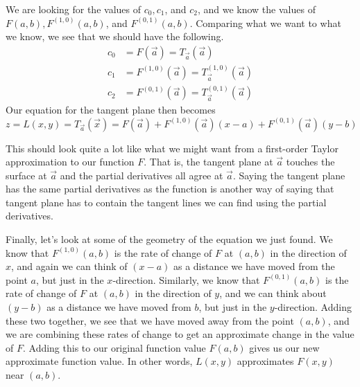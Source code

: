 \documentclass{ximera}
\begin{document}
We are looking for the values of $c_0, c_1$, and $c_2$, and we know the values of $F(a,b), F^{(1,0)}(a,b)$, and $F^{(0,1)}(a,b)$.  Comparing what we want to what we know, we see that we should have the following.
\begin{align*}
c_0 &= F(\vec{a})=T_{\vec{a}}(\vec{a}) \\
c_1 & = F^{(1,0)}(\vec{a})= T_{\vec{a}}^{(1,0)}(\vec{a})\\
c_2 &= F^{(0,1)}(\vec{a})= T_{\vec{a}}^{(0,1)}(\vec{a})
\end{align*}
Our equation for the tangent plane then becomes
\[
z = L(x,y) = T_{\vec{a}}(\vec{x})=F(\vec{a})+ F^{(1,0)}(\vec{a}) (x-a)+ F^{(0,1)}(\vec{a}) (y-b)
\]

This should look quite a lot like what we might want from a first-order Taylor approximation to our function $F$.  That is, the tangent plane at $\vec{a}$ touches the surface at $\vec{a}$ and the partial derivatives all agree at $\vec{a}$.  Saying the tangent plane has the same partial derivatives as the function is another way of saying that tangent plane has to contain the tangent lines we can find using the partial derivatives.

Finally, let's look at some of the geometry of the equation we just found.  We know that $F^{(1,0)}(a,b)$ is the rate of change of $F$ at $(a,b)$ in the direction of $x$, and again we can think of $(x-a)$ as a distance we have moved from the point $a$, but just in the $x$-direction.  Similarly, we know that $F^{(0,1)}(a,b)$ is the rate of change of $F$ at $(a,b)$ in the direction of $y$, and we can think about $(y-b)$ as a distance we have moved from $b$, but just in the $y$-direction.  Adding these two together, we see that we have moved away from the point $(a,b)$, and we are combining these rates of change to get an approximate change in the value of $F$.  Adding this to our original function value $F(a,b)$ gives us our new approximate function value.  In other words, $L(x,y)$ approximates $F(x,y)$ near $(a,b)$.
\end{document}
